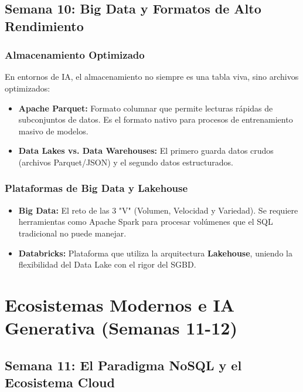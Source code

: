 \documentclass[12pt,a4paper,openany,oneside]{book}
\begin{document}
\section{Semana 10: Big Data y Formatos de Alto Rendimiento}

\subsection{Almacenamiento Optimizado}
En entornos de IA, el almacenamiento no siempre es una tabla viva, sino archivos optimizados:
\begin{itemize}
    \item \textbf{Apache Parquet:} Formato columnar que permite lecturas rápidas de subconjuntos de datos. Es el formato nativo para procesos de entrenamiento masivo de modelos.
    \item \textbf{Data Lakes vs. Data Warehouses:} El primero guarda datos crudos (archivos Parquet/JSON) y el segundo datos estructurados.
\end{itemize}

\subsection{Plataformas de Big Data y Lakehouse}
\begin{itemize}
    \item \textbf{Big Data:} El reto de las 3 "V" (Volumen, Velocidad y Variedad). Se requiere herramientas como Apache Spark para procesar volúmenes que el SQL tradicional no puede manejar.
    \item \textbf{Databricks:} Plataforma que utiliza la arquitectura \textbf{Lakehouse}, uniendo la flexibilidad del Data Lake con el rigor del SGBD.
\end{itemize}








\chapter{Ecosistemas Modernos e IA Generativa (Semanas 11-12)}

\section{Semana 11: El Paradigma NoSQL y el Ecosistema Cloud}
\end{document}
